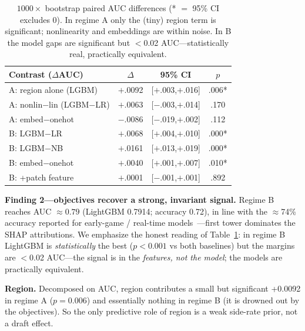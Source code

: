 \documentclass[sigconf,nonacm]{acmart}
\begin{document}
\begin{table}[t]
\caption{$1000\times$ bootstrap paired AUC differences (* $=$ 95\% CI excludes 0).
In regime A only the (tiny) region term is significant; nonlinearity and
embeddings are within noise. In B the model gaps are significant but $<$0.02
AUC---statistically real, practically equivalent.}
\label{tab:sig}
\footnotesize
\begin{tabular}{lccc}
\toprule
Contrast ($\Delta$AUC) & $\Delta$ & 95\% CI & $p$ \\
\midrule
A: region alone (LGBM)       & $+$.0092 & [$+$.003,$+$.016] & .006* \\
A: nonlin$-$lin (LGBM$-$LR)  & $+$.0063 & [$-$.003,$+$.014] & .170 \\
A: embed$-$onehot            & $-$.0086 & [$-$.019,$+$.002] & .112 \\
B: LGBM$-$LR                 & $+$.0068 & [$+$.004,$+$.010] & .000* \\
B: LGBM$-$NB                 & $+$.0161 & [$+$.013,$+$.019] & .000* \\
B: embed$-$onehot            & $+$.0040 & [$+$.001,$+$.007] & .010* \\
B: +patch feature            & $+$.0001 & [$-$.001,$+$.001] & .892 \\
\bottomrule
\end{tabular}
\end{table}

\textbf{Finding 2---objectives recover a strong, invariant signal.} Regime B
reaches AUC $\approx 0.79$ (LightGBM 0.7914; accuracy 0.72), in line with the
$\approx$74\% accuracy reported for early-game / real-time models~\cite{combined}---first
tower dominates the SHAP attributions. We emphasize the honest reading of
Table~\ref{tab:sig}: in regime B LightGBM is \emph{statistically} the best
($p<0.001$ vs both baselines) but the margins are $<$0.02 AUC---the signal is in
the \emph{features, not the model}; the models are practically equivalent.

\textbf{Region.} Decomposed on AUC, region contributes a small but significant
+0.0092 in regime A ($p = 0.006$) and essentially nothing in regime B (it is
drowned out by the objectives). So the only predictive role of region is a weak
side-rate prior, not a draft effect.
\end{document}
